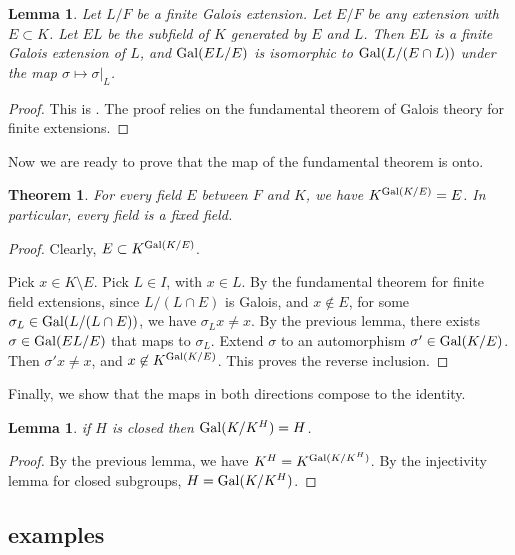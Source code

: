 \documentclass{amsart}
\newtheorem{theorem}[equation]{Theorem}
\newtheorem{lemma}[equation]{Lemma}
\begin{document}
\begin{lemma}
Let $L/F$ be a finite Galois extension.  Let $E/F$ be any extension with $E\subset K$.
Let $EL$ be the subfield of $K$ generated by $E$ and $L$.  Then
$EL$ is a finite Galois extension of $L$, and 
${\operatorname{Gal}}(EL/E)$ is isomorphic to ${\operatorname{Gal}}(L/(E\cap L))$ under the map 
$\sigma\mapsto\sigma|_L$.
\end{lemma}

\begin{proof} This is \cite[14.4~Prop.~19]{DF}. The proof relies on the fundamental
theorem of Galois theory for finite extensions.
\end{proof}


Now we are ready to prove that the map of the fundamental theorem is onto.

\begin{theorem}
For every field $E$ between $F$ and $K$, we have $K^{{\operatorname{Gal}}(K/E)}  = E$.
In particular, every field is a fixed field.
\end{theorem}

\begin{proof} 
Clearly, $E\subset K^{{\operatorname{Gal}}(K/E)}$.

Pick $x\in K\setminus E$.  Pick $L\in I$, with $x\in L$.
  By the fundamental theorem for finite field extensions, since
  $L/(L\cap E)$ is Galois, and $x\not\in E$, for some $\sigma_L\in
  {\operatorname{Gal}}(L/(L\cap E))$, we have $\sigma_L x \ne x$.
By the previous lemma, there exists $\sigma\in {\operatorname{Gal}}(EL/E)$ that maps
to $\sigma_L$.  Extend $\sigma$ to an automorphism $\sigma'\in{\operatorname{Gal}}(K/E)$.
Then $\sigma'x \ne x$, and $x\not\in K^{{\operatorname{Gal}}(K/E)}$.  
This proves the reverse inclusion.
\end{proof}

Finally, we show that the maps in both directions compose to the identity.

\begin{lemma} if $H$ is closed then ${\operatorname{Gal}}(K/K^H) = H$.
\end{lemma}

\begin{proof}
By the previous lemma,
we have $K^H = K^{{\operatorname{Gal}}(K/K^H)}$.  By the injectivity lemma for closed subgroups,
$H = {\operatorname{Gal}}(K/K^H)$.
\end{proof}



\subsection{examples}
\end{document}
